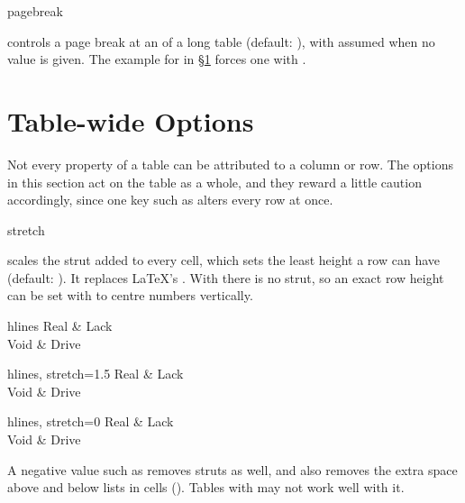 \begin{codedescribe}[
    key,
    new=2022A
  ]{pagebreak}
  \begin{codesyntax}
  \end{codesyntax}
   controls a page break at an  of a long table (default: ), with  assumed when no value is given. The example for  in \S\ref{inner:table} forces one with .
\end{codedescribe}

\section{Table-wide Options}\label{inner:table}
Not every property of a table can be attributed to a column or row. The options in this section act on the table as a whole, and they reward a little caution accordingly, since one key such as  alters every row at once.

\begin{codedescribe}[
    key,
    new=2021G
  ]{stretch}
  \begin{codesyntax}
  \end{codesyntax}
   scales the strut added to every cell, which sets the least height a row can have (default: ). It replaces \LaTeX's . With  there is no strut, so an exact row height can be set with  to centre numbers vertically.

  \begin{codestore}[st=table:stretch]
    \begin{tblr}{hlines}
      Real & Lack  \\
      Void & Drive
    \end{tblr}\quad
    \begin{tblr}{hlines, stretch=1.5}
      Real & Lack  \\
      Void & Drive
    \end{tblr}\quad
    \begin{tblr}{hlines, stretch=0}
      Real & Lack  \\
      Void & Drive
    \end{tblr}\end{codestore}
  \begin{center}
  \end{center}
  \begin{tsremark}
    A negative value such as  removes struts as well, and also removes the extra space above and below lists in cells (). Tables with  may not work well with it.
  \end{tsremark}
\end{codedescribe}

